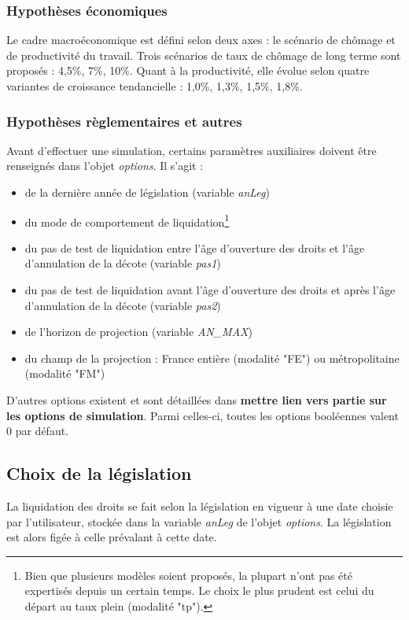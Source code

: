 \subsubsection{Hypothèses économiques}
Le cadre macroéconomique est défini selon deux axes : le scénario de chômage et de productivité du travail. Trois scénarios de taux de chômage de long terme sont proposés : 4,5\%, 7\%, 10\%. Quant à la productivité, elle évolue selon quatre variantes de croissance tendancielle : 1,0\%, 1,3\%, 1,5\%, 1,8\%.

\subsubsection{Hypothèses règlementaires et autres}
Avant d'effectuer une simulation, certains paramètres auxiliaires doivent être renseignés dans l'objet \textit{options}. Il s'agit :
\begin{itemize}
\item de la dernière année de législation (variable \textit{anLeg})
\item du mode de comportement de liquidation\footnote{Bien que plusieurs modèles soient proposés, la plupart n'ont pas été expertisés depuis un certain temps. Le choix le plus prudent est celui du départ au taux plein (modalité "tp").}
\item du pas de test de liquidation entre l'âge d'ouverture des droits et l'âge d'annulation de la décote (variable \textit{pas1})
\item du pas de test de liquidation avant l'âge d'ouverture des droits et après l'âge d'annulation de la décote (variable \textit{pas2})
\item de l'horizon de projection (variable \textit{AN\_MAX})
\item du champ de la projection : France entière (modalité "FE") ou métropolitaine (modalité "FM")
\end{itemize}
D'autres options existent et sont détaillées dans \textbf{mettre lien vers partie sur les options de simulation}. Parmi celles-ci, toutes les options booléennes valent 0 par défaut.

\subsection{Choix de la législation}
La liquidation des droits se fait selon la législation en vigueur à une date choisie par l'utilisateur, stockée dans la variable \textit{anLeg} de l'objet \textit{options}. La législation est alors figée à celle prévalant à cette date.

